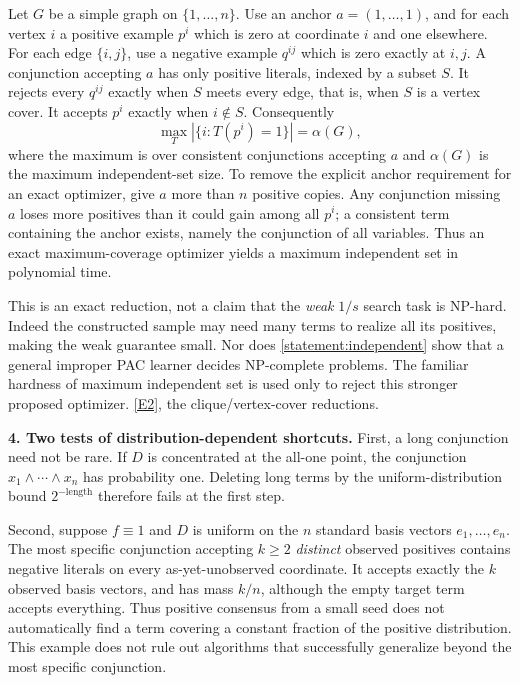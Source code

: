 \documentclass[11pt,a4paper]{article}
\newcommand{\eref}[2]{\hyperlink{extra:#1:#2}{[E#2]}}
\numberwithin{equation}{section}
\begin{document}
Let $G$ be a simple graph on $\{1,\ldots,n\}$. Use an anchor
$a=(1,\ldots,1)$, and for each vertex $i$ a positive example $p^i$ which
is zero at coordinate $i$ and one elsewhere. For each edge $\{i,j\}$,
use a negative example $q^{ij}$ which is zero exactly at $i,j$.
A conjunction accepting $a$ has only positive literals, indexed by a
subset $S$. It rejects every $q^{ij}$ exactly when $S$ meets every edge,
that is, when $S$ is a vertex cover. It accepts $p^i$ exactly when
$i\notin S$. Consequently
\begin{equation}\label{statement:independent}
 \max_T|\{i:T(p^i)=1\}|=\alpha(G),
\end{equation}
where the maximum is over consistent conjunctions accepting $a$ and
$\alpha(G)$ is the maximum independent-set size.
To remove the explicit anchor requirement for an exact optimizer, give
$a$ more than $n$ positive copies. Any conjunction missing $a$ loses
more positives than it could gain among all $p^i$; a consistent term
containing the anchor exists, namely the conjunction of all variables.
Thus an exact maximum-coverage optimizer yields a maximum independent
set in polynomial time.

This is an exact reduction, not a claim that the \emph{weak} $1/s$
search task is NP-hard. Indeed the constructed sample may need many
terms to realize all its positives, making the weak guarantee small.
Nor does \eqref{statement:independent} show that a general improper PAC
learner decides NP-complete problems. The familiar hardness of maximum
independent set is used only to reject this stronger proposed optimizer.
\eref{statement}{2}, the clique/vertex-cover reductions.

\textbf{4. Two tests of distribution-dependent shortcuts.}
First, a long conjunction need not be rare. If $D$ is concentrated at
the all-one point, the conjunction $x_1\wedge\cdots\wedge x_n$ has
probability one. Deleting long terms by the uniform-distribution bound
$2^{-\text{length}}$ therefore fails at the first step.

Second, suppose $f\equiv1$ and $D$ is uniform on the $n$ standard basis
vectors $e_1,\ldots,e_n$. The most specific conjunction accepting
$k\ge2$ \emph{distinct} observed positives contains negative literals
on every as-yet-unobserved coordinate. It accepts exactly the $k$
observed basis vectors, and has mass $k/n$, although the empty target
term accepts everything. Thus positive consensus from a small seed does
not automatically find a term covering a constant fraction of the
positive distribution. This example does not rule out algorithms that
successfully generalize beyond the most specific conjunction.
\end{document}
